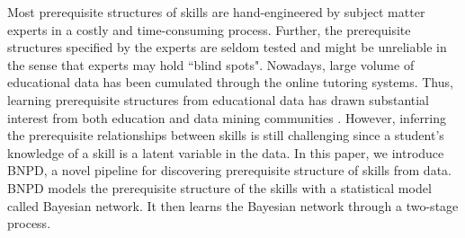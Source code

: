 \documentclass{edm_template}
\begin{document}
Most prerequisite structures of skills are hand-engineered by subject matter experts in a costly and time-consuming process. 
Further, the prerequisite structures specified by the experts are seldom tested and might be unreliable in
the sense that experts may hold ``blind spots".
Nowadays, large volume of educational data has been cumulated through the online tutoring systems.  
Thus, learning prerequisite structures from educational data has drawn substantial interest from both education and data mining communities \cite{desmarais2006learned,vuong2010method, brunskill2010estimating,scheines2014discovering,chen2015discovering,piech2015deep}.
However, inferring the prerequisite relationships between skills is still challenging since a student's knowledge of a skill is a latent variable in the data.
In this paper, we introduce BNPD, a novel pipeline for discovering prerequisite structure of skills from data. 
BNPD models the prerequisite structure of the skills with a statistical model called Bayesian network.
It then learns the Bayesian network through a two-stage process. 




\end{document}
